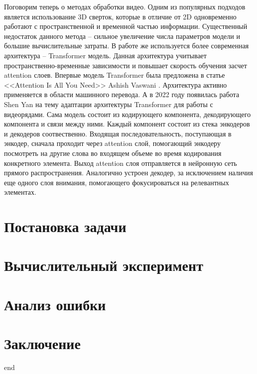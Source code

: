\documentclass[12pt,twoside]{article}
\begin{document}
Поговорим теперь о методах обработки видео.
Одним из популярных подходов является использование 3D сверток, 
которые в отличие от 2D одновременно работают с пространственной  
и временной частью информации. Существенный недостаток данного метода -- 
сильное увеличение числа параметров модели и большие вычислительные затраты.
В работе же используется более современная архитектура -- Transformer модель.
Данная архитектура учитывает пространственно-временные зависимости и повышает скорость обучения засчет attention слоев.
Впервые модель Transformer была предложена в статье <<Attention Is All You Need>> Ashish Vaswani 
\citep{https://doi.org/10.48550/arxiv.1706.03762}. Архитектура активно применяется в области машинного перевода.
А в 2022 году появилась работа Shen Yan \citep{transformer} на тему адаптации архитектуры Transformer для работы с видеорядами. 
Сама модель состоит из кодирующего компонента, декодирующего компонента и связи между ними. Каждый компонент состоит из стека 
энкодеров и декодеров соотвественно. 
Входящая последовательность, поступающая в энкодер, сначала проходит через attention слой, помогающий энкодеру 
посмотреть на другие слова во входящем объеме во время кодирования конкретного элемента. 
Выход attention слоя отправляется в нейронную сеть прямого распространения. 
Аналогично устроен декодер, за исключением наличия еще одного слоя внимания, помогающего фокусироваться на релевантных элементах.




\section{Постановка задачи}

\section{Вычислительный эксперимент}


\section{Анализ ошибки}

\section{Заключение}
end






\end{document}
